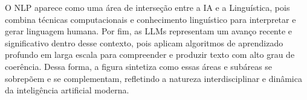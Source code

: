 O NLP aparece como uma área de interseção entre a IA e a Linguística, pois combina técnicas computacionais e conhecimento linguístico para interpretar e gerar linguagem humana. 
Por fim, as LLMs representam um avanço recente e significativo dentro desse contexto, pois aplicam algoritmos de aprendizado profundo em larga escala para compreender e produzir texto com alto grau de coerência. Dessa forma, a figura sintetiza como essas áreas e subáreas se sobrepõem e se complementam, refletindo a natureza interdisciplinar e dinâmica da inteligência artificial moderna.